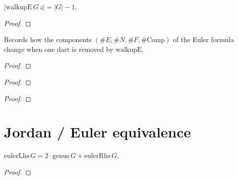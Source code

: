 \begin{theorem}
  \label{thm:card-walkupE}
  \leanok
  $|\mathrm{walkupE}\,G\,z| = |G| - 1$.
\end{theorem}
\begin{proof}\leanok\end{proof}

\begin{theorem}
  \label{thm:walkupE-euler-components}
  \leanok
  Records how the components $(\#E, \#N, \#F, \#\mathrm{Comp})$ of the Euler
  formula change when one dart is removed by $\mathrm{walkupE}$.
\end{theorem}
\begin{proof}\notready\end{proof}

\begin{theorem}
  \label{thm:planar-walkupE}
  \leanok
\end{theorem}
\begin{proof}\leanok\end{proof}

\begin{theorem}
  \label{thm:jordan-walkupE}
  \leanok
\end{theorem}
\begin{proof}\notready\end{proof}

\chapter{Jordan / Euler equivalence}


\begin{theorem}
  \label{thm:even-genusP}
  \leanok
  $\mathrm{eulerLhs}\,G = 2 \cdot \mathrm{genus}\,G + \mathrm{eulerRhs}\,G$.
\end{theorem}
\begin{proof}\leanok\end{proof}

